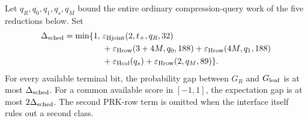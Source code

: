 \begin{theorem}
\label{thm:joint-message-leaf}
Let $q_R,q_0,q_1,q_s,q_M$ bound the entire ordinary compression-query work
of the five reductions below. Set
\begin{equation}
\begin{split}
 \Delta_{\rm sched}=\min\{1,\;&
 \varepsilon_{\rm Hjoint}(2,t_+,q_R,32)\\
 &+\varepsilon_{\rm Hrow}(3+4M,q_0,188)
  +\varepsilon_{\rm Hrow}(4M,q_1,188)\\
 &+\varepsilon_{\rm Hcol}(q_s)
  +\varepsilon_{\rm Hrow}(2,q_M,89)\}.
\end{split}
 \label{eq:joint-schedule-error}
\end{equation}
For every available terminal bit, the probability gap between $G_R$ and
$G_{\rm leaf}$ is at most $\Delta_{\rm sched}$.
For a common available score in $[-1,1]$, the expectation gap is at most
$2\Delta_{\rm sched}$. The second PRK-row term is omitted when the interface
itself rules out a second class.
\end{theorem}
